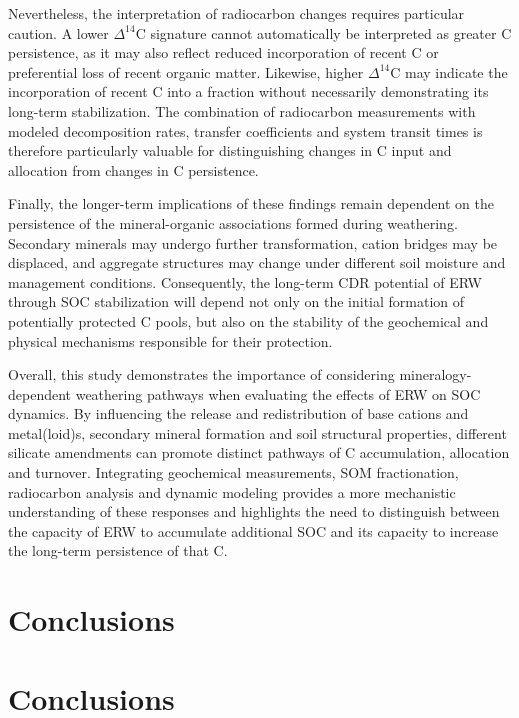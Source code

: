 \documentclass[preprint,12pt]{elsarticle}
\begin{document}
Nevertheless, the interpretation of radiocarbon changes requires particular caution. A lower $\Delta^{14}$C signature cannot automatically be interpreted as greater C persistence, as it may also reflect reduced incorporation of recent C or preferential loss of recent organic matter. Likewise, higher $\Delta^{14}$C may indicate the incorporation of recent C into a fraction without necessarily demonstrating its long-term stabilization. The combination of radiocarbon measurements with modeled decomposition rates, transfer coefficients and system transit times is therefore particularly valuable for distinguishing changes in C input and allocation from changes in C persistence.

Finally, the longer-term implications of these findings remain dependent on the persistence of the mineral-organic associations formed during weathering. Secondary minerals may undergo further transformation, cation bridges may be displaced, and aggregate structures may change under different soil moisture and management conditions. Consequently, the long-term CDR potential of ERW through SOC stabilization will depend not only on the initial formation of potentially protected C pools, but also on the stability of the geochemical and physical mechanisms responsible for their protection.

Overall, this study demonstrates the importance of considering mineralogy-dependent weathering pathways when evaluating the effects of ERW on SOC dynamics. By influencing the release and redistribution of base cations and metal(loid)s, secondary mineral formation and soil structural properties, different silicate amendments can promote distinct pathways of C accumulation, allocation and turnover. Integrating geochemical measurements, SOM fractionation, radiocarbon analysis and dynamic modeling provides a more mechanistic understanding of these responses and highlights the need to distinguish between the capacity of ERW to accumulate additional SOC and its capacity to increase the long-term persistence of that C.

\section{Conclusions}
\label{sec:conclusions}

\section{Conclusions}
\label{sec:conclusions}
\end{document}
